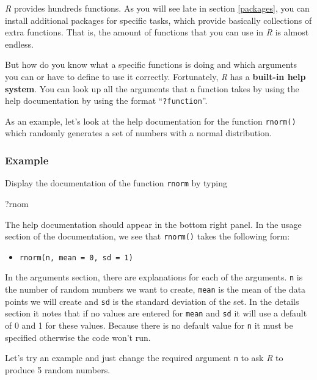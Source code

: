 \documentclass[
]{scrartcl}
\newenvironment{Shaded}{\begin{snugshade}}{\end{snugshade}}
\newcommand{\NormalTok}[1]{#1}
\providecommand{\tightlist}{%
  \setlength{\itemsep}{0pt}\setlength{\parskip}{0pt}}
\begin{document}
\emph{R} provides hundreds functions. As you will see late in section \ref{packages}, you can install additional packages for specific tasks, which provide basically collections of extra functions. That is, the amount of functions that you can use in \emph{R} is almost endless.

But how do you know what a specific functions is doing and which arguments you can or have to define to use it correctly. Fortunately, \emph{R} has a \textbf{built-in help system}. You can look up all the arguments that a function takes by using the help documentation by using the format ``\texttt{?function}''.

As an example, let's look at the help documentation for the function \texttt{rnorm()} which randomly generates a set of numbers with a normal distribution.

\hypertarget{examplernorm}{%
\subsubsection{Example}\label{examplernorm}}

Display the documentation of the function \texttt{rnorm} by typing

\begin{Shaded}
\begin{Highlighting}[]
\NormalTok{?rnom}
\end{Highlighting}
\end{Shaded}

The help documentation should appear in the bottom right panel. In the usage section of the documentation, we see that \texttt{rnorm()} takes the following form:

\begin{itemize}
\tightlist
\item
  \texttt{rnorm(n,\ mean\ =\ 0,\ sd\ =\ 1)}
\end{itemize}

In the arguments section, there are explanations for each of the arguments. \texttt{n} is the number of random numbers we want to create, \texttt{mean} is the mean of the data points we will create and \texttt{sd} is the standard deviation of the set. In the details section it notes that if no values are entered for \texttt{mean} and \texttt{sd} it will use a default of 0 and 1 for these values. Because there is no default value for \texttt{n} it must be specified otherwise the code won't run.

Let's try an example and just change the required argument \texttt{n} to ask \emph{R} to produce 5 random numbers.
\end{document}
